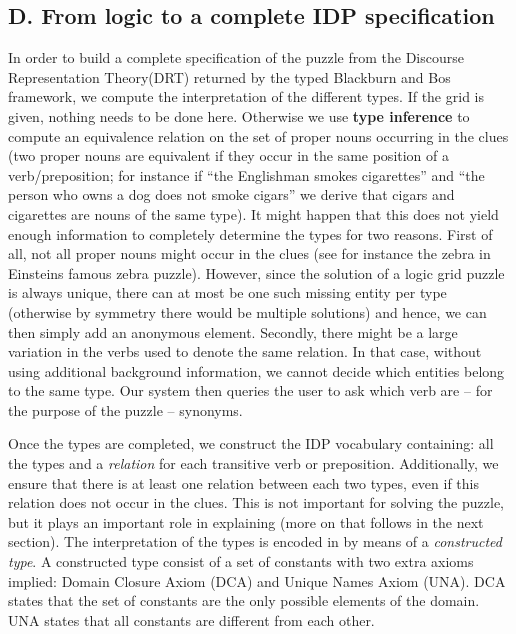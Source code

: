 \subsection{D. From logic to a complete IDP specification} 
In order to build a complete specification of the puzzle from the Discourse Representation Theory(DRT) returned by the typed Blackburn and Bos framework, we compute the interpretation of the different types. If the grid is given, nothing needs to be done here. Otherwise we use \textbf{type inference} to compute an equivalence relation on the set of proper nouns occurring in the clues (two proper nouns are equivalent if they occur in the same position of a verb/preposition; for instance if ``the Englishman smokes cigarettes'' and ``the person who owns a dog does not smoke cigars'' we derive that cigars and cigarettes are nouns of the same type). It might happen that this does not yield enough information to completely determine the types for two reasons. 
First of all, not all proper nouns might occur in the clues (see for instance the zebra in Einsteins famous zebra puzzle). 
However, since the solution of a logic grid puzzle is always unique, there can at most be one such missing entity per type (otherwise by symmetry there would be multiple solutions) and hence, we can then simply add an anonymous element. 
Secondly, there might be a large variation in the verbs used to denote the same relation. In that case, without using additional background information, we cannot decide which entities belong to the same type. Our system then queries the user to ask which verb are -- for the purpose of the puzzle -- synonyms. 

Once the types are completed, we construct the IDP vocabulary containing: all the types and a \textit{relation} for each transitive verb or preposition. 
Additionally, we ensure that there is at least one relation between each two types, even if this relation does not occur in the clues. This is not important for solving the puzzle, but it plays an important role in explaining (more on that follows in the next section). 
The interpretation of the types is encoded in \idp by means of a \emph{constructed type}.  A constructed type consist of a set of constants with two extra axioms implied: Domain Closure Axiom (DCA) and Unique Names Axiom (UNA). DCA states that the set of constants are the only possible elements of the domain. UNA states that all constants are different from each other.

